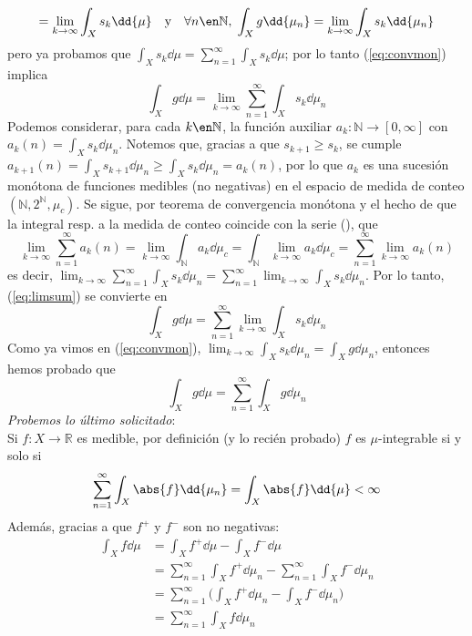 \begin{sol}
\begin{equation}
= \lim_{k\to\infty} \int_X s_k \dd{\mu}
\quad\text{y}\quad
\forall n\en\mathbb{N},\;
\int_X g \dd{\mu_n} 
= \lim_{k\to\infty} \int_X s_k \dd{\mu_n}
\end{equation}
pero ya probamos que $\int_X s_k \dd{\mu} = \sum^\infty_{n=1}\int_X s_k \dd{\mu}$; por lo tanto (\ref{eq:convmon}) implica
\begin{equation}\label{eq:limsum}
    \int_X g \dd{\mu} 
    = \lim_{k\to\infty}\sum^\infty_{n=1}\int_X s_k \dd{\mu_n}
\end{equation}
Podemos considerar, para cada $k\en\mathbb{N}$, la función auxiliar $a_k \colon \mathbb{N} \to [0,\infty]$ con $a_k(n) = \int_X s_k \dd{\mu_n}$. Notemos que, gracias a que $s_{k+1} \ge s_k$, se cumple $a_{k+1}(n) = \int_X s_{k+1} \dd{\mu_n} \ge \int_X s_{k} \dd{\mu_n} = a_k(n)$, por lo que $a_k$ es una sucesión monótona de funciones medibles (no negativas) en el espacio de medida de conteo $(\mathbb{N},2^{\mathbb{N}},\mu_c)$. Se sigue, por teorema de convergencia monótona y el hecho de que la integral  resp. a la medida de conteo coincide con la serie (), que
\[
\lim_{k\to\infty} \sum^\infty_{n=1} a_{k}(n)
= \lim_{k\to\infty} \int_\mathbb{N} a_{k} \dd{\mu_c}
= \int_{\mathbb{N}} \lim_{k\to\infty} a_k \dd{\mu_c}
= \sum^\infty_{n=1} \lim_{k\to\infty} a_k(n)
\]
es decir, $\lim_{k\to\infty}\sum^\infty_{n=1}\int_X s_k \dd{\mu_n} = \sum^\infty_{n=1}\lim_{k\to\infty}\int_X s_k \dd{\mu_n}$. Por lo tanto, (\ref{eq:limsum}) se convierte en
\[
\int_X g \dd{\mu}
= \sum^\infty_{n=1}\lim_{k\to\infty}\int_X s_k \dd{\mu_n}
\]
Como ya vimos en (\ref{eq:convmon}), $\lim_{k\to\infty}\int_X s_k \dd{\mu_n} = \int_X g \dd{\mu_n}$, entonces hemos probado que
\[
\int_X g \dd{\mu}
= \sum^\infty_{n=1} \int_X g \dd{\mu_n}
\]
\emph{Probemos lo último solicitado}:\\
Si $f\colon X \to \mathbb{R}$ es medible, por definición (y lo recién probado) $f$ es $\mu$-integrable si y solo si 
\[
\sum^\infty_{n=1} \int_X \abs{f} \dd{\mu_n}=\int_X \abs{f} \dd{\mu} < \infty
\]
Además, gracias a que $f^+$ y $f^-$ son no negativas:
\begin{align*}
\int_X f \dd{\mu} 
&= \int_X f^+ \dd{\mu} - \int_X f^- \dd{\mu}\\
&= \sum^\infty_{n=1} \int_X f^+ \dd{\mu_n} - \sum^\infty_{n=1}\int_X f^- \dd{\mu_n}\\
&= \sum^\infty_{n=1} \biggl( \int_X f^+ \dd{\mu_n} - \int_X f^- \dd{\mu_n} \biggr)\\
&= \sum^\infty_{n=1} \int_X f \dd{\mu_n}
\end{align*}
\end{sol}